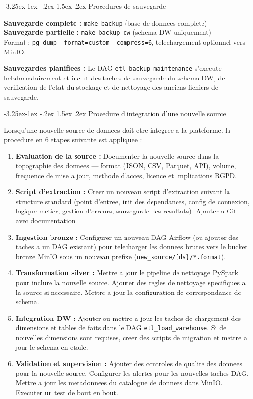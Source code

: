 \documentclass[a4paper,11pt,oneside,openany]{report}
\makeatletter
\renewcommand\subsection{\@startsection{subsection}{2}{\z@}%
  {-3.25ex\@plus -1ex \@minus -.2ex}%
  {1.5ex \@plus .2ex}%
  {\normalfont\large\bfseries\color{ntdarkgreen}}}
\newcommand{\rgpd}{RGPD}
\makeatother
\begin{document}
\subsection{Procedures de sauvegarde}

\textbf{Sauvegarde complete :} \texttt{make backup} (base de donnees complete)\\
\textbf{Sauvegarde partielle :} \texttt{make backup-dw} (schema DW uniquement)\\
Format : \texttt{pg\_dump --format=custom --compress=6}, telechargement
optionnel vers MinIO.

\textbf{Sauvegardes planifiees :} Le DAG \texttt{etl\_backup\_maintenance}
s'execute hebdomadairement et inclut des taches de sauvegarde du schema DW,
de verification de l'etat du stockage et de nettoyage des anciens fichiers
de sauvegarde.


\subsection{Procedure d'integration d'une nouvelle source}

Lorsqu'une nouvelle source de donnees doit etre integree a la plateforme,
la procedure en 6 etapes suivante est appliquee :

\begin{enumerate}[nosep]
  \item \textbf{Evaluation de la source :} Documenter la nouvelle source dans la
        topographie des donnees --- format (JSON, CSV, Parquet, API), volume,
        frequence de mise a jour, methode d'acces, licence et implications \rgpd{}.
  \item \textbf{Script d'extraction :} Creer un nouveau script d'extraction suivant
        la structure standard (point d'entree, init des dependances, config de
        connexion, logique metier, gestion d'erreurs, sauvegarde des resultats).
        Ajouter a Git avec documentation.
  \item \textbf{Ingestion bronze :} Configurer un nouveau DAG Airflow (ou ajouter
        des taches a un DAG existant) pour telecharger les donnees brutes vers
        le bucket bronze MinIO sous un nouveau prefixe
        (\texttt{new\_source/\{ds\}/*.format}).
  \item \textbf{Transformation silver :} Mettre a jour le pipeline de nettoyage
        PySpark pour inclure la nouvelle source. Ajouter des regles de nettoyage
        specifiques a la source si necessaire. Mettre a jour la configuration de
        correspondance de schema.
  \item \textbf{Integration DW :} Ajouter ou mettre a jour les taches de
        chargement des dimensions et tables de faits dans le DAG
        \texttt{etl\_load\_warehouse}. Si de nouvelles dimensions sont requises,
        creer des scripts de migration et mettre a jour le schema en etoile.
  \item \textbf{Validation et supervision :} Ajouter des controles de qualite des
        donnees pour la nouvelle source. Configurer les alertes pour les nouvelles
        taches DAG. Mettre a jour les metadonnees du catalogue de donnees dans
        MinIO. Executer un test de bout en bout.
\end{enumerate}
\end{document}
